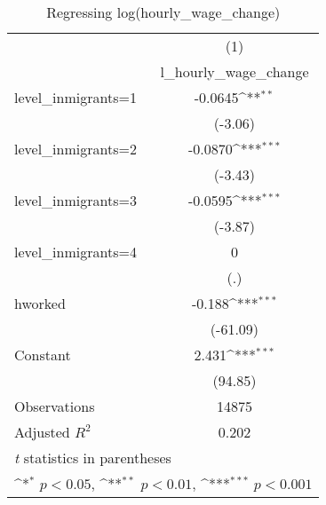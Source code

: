 \begin{table}[htbp]\centering
\def\sym#1{\ifmmode^{#1}\else\(^{#1}\)\fi}
\caption{Regressing log(hourly\_wage\_change)}
\begin{tabular}{l*{1}{c}}
\hline\hline
                    &\multicolumn{1}{c}{(1)}\\
                    &\multicolumn{1}{c}{l\_hourly\_wage\_change}\\
\hline
level\_inmigrants=1  &     -0.0645\sym{**} \\
                    &     (-3.06)         \\
[1em]
level\_inmigrants=2  &     -0.0870\sym{***}\\
                    &     (-3.43)         \\
[1em]
level\_inmigrants=3  &     -0.0595\sym{***}\\
                    &     (-3.87)         \\
[1em]
level\_inmigrants=4  &           0         \\
                    &         (.)         \\
[1em]
hworked             &      -0.188\sym{***}\\
                    &    (-61.09)         \\
[1em]
Constant            &       2.431\sym{***}\\
                    &     (94.85)         \\
\hline
Observations        &       14875         \\
Adjusted \(R^{2}\)  &       0.202         \\
\hline\hline
\multicolumn{2}{l}{\footnotesize \textit{t} statistics in parentheses}\\
\multicolumn{2}{l}{\footnotesize \sym{*} \(p<0.05\), \sym{**} \(p<0.01\), \sym{***} \(p<0.001\)}\\
\end{tabular}
\end{table}
